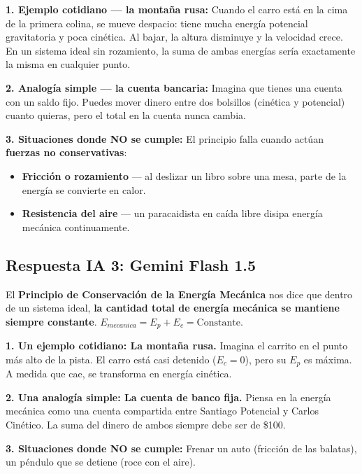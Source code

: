 \documentclass[11pt]{article}
\begin{document}
\textbf{1. Ejemplo cotidiano — la montaña rusa:} Cuando el carro está en la cima de la primera colina, se mueve despacio: tiene mucha energía potencial gravitatoria y poca cinética. Al bajar, la altura disminuye y la velocidad crece. En un sistema ideal sin rozamiento, la suma de ambas energías sería exactamente la misma en cualquier punto.

\textbf{2. Analogía simple — la cuenta bancaria:} Imagina que tienes una cuenta con un saldo fijo. Puedes mover dinero entre dos bolsillos (cinética y potencial) cuanto quieras, pero el total en la cuenta nunca cambia.

\textbf{3. Situaciones donde NO se cumple:} El principio falla cuando actúan \textbf{fuerzas no conservativas}:
\begin{itemize}
	\item \textbf{Fricción o rozamiento} — al deslizar un libro sobre una mesa, parte de la energía se convierte en calor.
	\item \textbf{Resistencia del aire} — un paracaidista en caída libre disipa energía mecánica continuamente.
\end{itemize}

\subsection*{Respuesta IA 3: Gemini Flash 1.5}
El \textbf{Principio de Conservación de la Energía Mecánica} nos dice que dentro de un sistema ideal, \textbf{la cantidad total de energía mecánica se mantiene siempre constante}. $E_{mecanica} = E_p + E_c = \text{Constante}$.

\textbf{1. Un ejemplo cotidiano: La montaña rusa.} Imagina el carrito en el punto más alto de la pista. El carro está casi detenido ($E_c = 0$), pero su $E_p$ es máxima. A medida que cae, se transforma en energía cinética.

\textbf{2. Una analogía simple: La cuenta de banco fija.} Piensa en la energía mecánica como una cuenta compartida entre Santiago Potencial y Carlos Cinético. La suma del dinero de ambos siempre debe ser de \$100.

\textbf{3. Situaciones donde NO se cumple:} Frenar un auto (fricción de las balatas), un péndulo que se detiene (roce con el aire).
\end{document}
